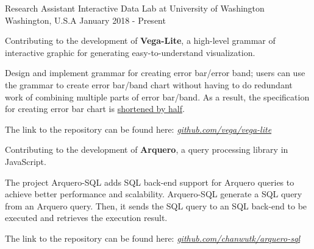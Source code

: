 \begin{cventries}
  \cventry
    {Research Assistant} %
    {Interactive Data Lab at University of Washington} %
    {Washington, U.S.A} %
    {January 2018 - Present} %
    {
      \begin{cvitems} %
        \item {
          Contributing to the development of \textbf{Vega-Lite}, a high-level grammar of interactive graphic for generating easy-to-understand visualization.
        }
        \item {
          Design and implement grammar for creating error bar/error band;
          users can use the grammar to create error bar/band chart without having to do redundant work of combining multiple parts of error bar/band.
          As a result, the specification for creating error bar chart is \underline{shortened by half}.
        }
        \item {
          The link to the repository can be found here: 
          \href{https://www.github.com/vega/vega-lite}{\textit{github.com/vega/vega-lite}}
        }
        \hfill \break
        \item {
          Contributing to the development of \textbf{Arquero}, a query processing library in JavaScript.
        }
        \item {
          The project Arquero-SQL adds SQL back-end support for Arquero queries to achieve better performance and scalability. Arquero-SQL generate a SQL query from an Arquero query.
          Then, it sends the SQL query to an SQL back-end to be executed and retrieves the execution result.
        }
        \item {
          The link to the repository can be found here: 
          \href{https://www.github.com/chanwutk/arquero-sql}{\textit{github.com/chanwutk/arquero-sql}}
        }
      \end{cvitems}
    }

\end{cventries}
